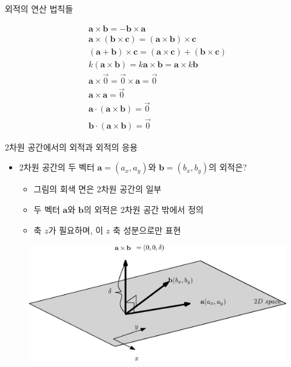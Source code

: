 \documentclass{beamer}
\begin{document}
\begin{frame}{외적의 연산 법칙들}

\begin{eqnarray}\nonumber
\mathbf a \times \mathbf b = - \mathbf b \times \mathbf a \\ \nonumber
\mathbf a \times ( \mathbf b \times \mathbf c) = (\mathbf a \times \mathbf b) \times \mathbf c \\ \nonumber
(\mathbf a + \mathbf b ) \times \mathbf c = (\mathbf a \times \mathbf c) + (\mathbf b \times \mathbf c) \\ \nonumber
k(\mathbf a \times \mathbf b) = k \mathbf a \times \mathbf b = \mathbf a \times k \mathbf b \\ \nonumber
\mathbf a \times \vec{0} = \vec{0} \times \mathbf a = \vec{0} \\ \nonumber
\mathbf a \times \mathbf a = \vec{0} \\ \nonumber
\mathbf a \cdot (  \mathbf a \times \mathbf b) = \vec{0} \\ \nonumber
\mathbf b \cdot ( \mathbf a \times \mathbf b) = \vec{0}
\end{eqnarray}

\end{frame}


\begin{frame}{2차원 공간에서의 외적과 외적의 응용}

\begin{itemize}
\item 2차원 공간의 두 벡터 $\mathbf a=(a_x, a_y)$와 $\mathbf b=(b_x, b_y)$의 외적은?
	\begin{itemize}
	\item 그림의 회색 면은 2차원 공간의 일부
	\item 두 벡터 $\mathbf a$와 $\mathbf b$의 외적은 2차원 공간 밖에서 정의
	\item 축 $z$가 필요하며, 이 $z$ 축 성분으로만 표현
	\end{itemize}
\end{itemize}

\begin{figure}
\includegraphics[width=12cm]{Math_vector/crossProduct2D.eps}
\end{figure}

\end{frame}
\end{document}
